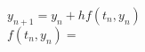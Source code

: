 \documentclass[12pt]{article}
\begin{document}
$y_{n+1} = y_n + hf(t_n, y_n)$ \\ 
$f(t_n, y_n) = $
\end{document}
